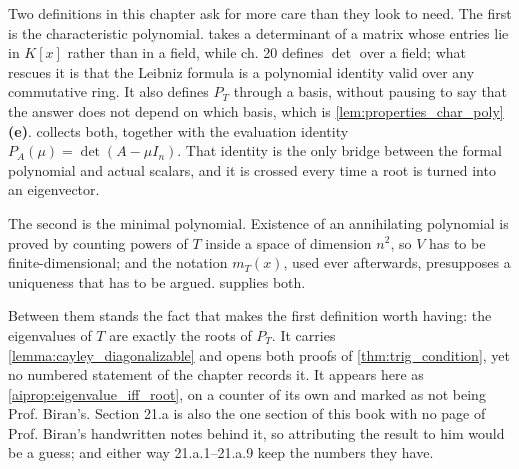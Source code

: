 \begin{ainote}
Two definitions in this chapter ask for more care than they look to need. The
first is the characteristic polynomial.  takes a determinant
of a matrix whose entries lie in $K[x]$ rather than in a field, while ch. 20
defines $\det$ over a field; what rescues it is that the Leibniz formula is a
polynomial identity valid over any commutative ring. It also defines $P_T$
through a basis, without pausing to say that the answer does not depend on which
basis, which is \cref{lem:properties_char_poly} \textbf{(e)}.
 collects both, together with the evaluation
identity $P_A(\mu) = \det(A - \mu I_n)$. That identity is the only bridge
between the formal polynomial and actual scalars, and it is crossed every time a
root is turned into an eigenvector.

The second is the minimal polynomial. Existence of an annihilating polynomial is
proved by counting powers of $T$ inside a space of dimension $n^2$, so $V$ has
to be finite-di\-men\-sional; and the notation $m_T(x)$, used ever afterwards,
presupposes a uniqueness that has to be argued.
 supplies both.

Between them stands the fact that makes the first definition worth having: the
eigenvalues of $T$ are exactly the roots of $P_T$. It carries
\cref{lemma:cayley_diagonalizable} and opens both proofs of
\cref{thm:trig_condition}, yet no numbered statement of the chapter records it.
It appears here as \cref{aiprop:eigenvalue_iff_root}, on a counter of its own
and marked as not being Prof. Biran's. Section 21.a is also the one section of
this book with no page of Prof. Biran's handwritten notes behind it, so
attributing the result to him would be a guess; and either way 21.a.1--21.a.9
keep the numbers they have.
\end{ainote}


